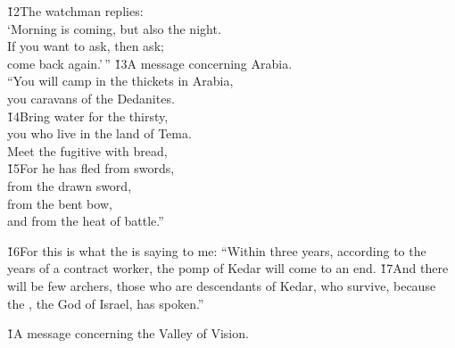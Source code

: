 \begin{poetry}
\poeml \v{12}The watchman replies: \\
\poemll    `Morning is coming, but also the night. \\
\poeml If you want to ask, then ask; \\
\poemll    come back again.'\,''
\poeml \v{13}A message concerning Arabia. \\
\poeml ``You will camp in the thickets in Arabia, \\
\poemll    you caravans of the Dedanites. \\
\poeml \v{14}Bring water for the thirsty, \\
\poemll    you who live in the land of Tema. \\
\poemlll       Meet the fugitive with bread, \\
\poeml \v{15}For he has fled from swords, \\
\poemll    from the drawn sword, \\
\poeml from the bent bow, \\
\poemll    and from the heat of battle.''
\end{poetry}

\v{16}For this is what the  is saying to me: ``Within three years, according to the years of a contract worker, the pomp of Kedar will come to an end. \v{17}And there will be few archers, those who are descendants of Kedar, who survive, because the , the God of Israel, has spoken.''

\v{1}A message concerning the Valley of Vision.


